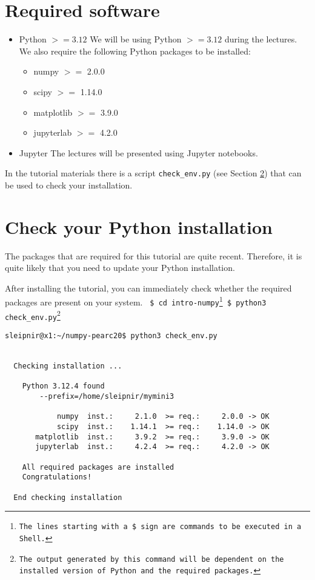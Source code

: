 \documentclass[11pt]{article}
\begin{document}
\section{Required software}
\begin{itemize}
  \item Python $>=3.12$ \newline
        We will be using Python $>=3.12$ during the lectures.
        We also require the following Python packages to be installed:
        \begin{itemize}
           \item numpy $>=$ 2.0.0 
           \item scipy $>=$ 1.14.0
           \item matplotlib $>=$ 3.9.0
           \item jupyterlab $>=$ 4.2.0
        \end{itemize} 

  \item Jupyter \newline
        The lectures will be presented using Jupyter notebooks.
\end{itemize}

In the tutorial materials there is a script \texttt{check\_env.py} 
(see Section \ref{section:check}) that can be used to check your installation.


\section{Check your Python installation}\label{section:check}
The packages that are required for this tutorial are quite recent.
Therefore, it is quite likely that you need to update your Python installation.

After installing the tutorial, you can immediately check whether the required packages 
are present on your system. \newline\newline
\texttt{
\$ cd intro-numpy\footnote{The lines starting with a \$ sign are commands to be executed in a Shell.} \newline
\$ python3 check\_env.py\footnote{The output generated by this command will be dependent on the installed version of Python and the required packages.}\newline
}

\begin{verbatim}
sleipnir@x1:~/numpy-pearc20$ python3 check_env.py


  Checking installation ...

    Python 3.12.4 found
        --prefix=/home/sleipnir/mymini3

            numpy  inst.:     2.1.0  >= req.:     2.0.0 -> OK 
            scipy  inst.:    1.14.1  >= req.:    1.14.0 -> OK 
       matplotlib  inst.:     3.9.2  >= req.:     3.9.0 -> OK 
       jupyterlab  inst.:     4.2.4  >= req.:     4.2.0 -> OK 

    All required packages are installed
    Congratulations!

  End checking installation
\end{verbatim}  
\end{document}

